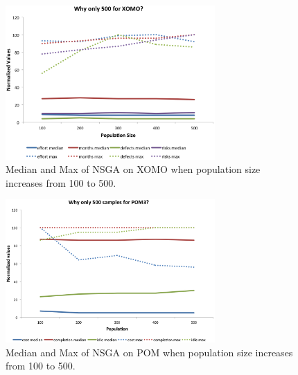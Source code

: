 \documentclass[11pt,twocolumn]{article}
\begin{document}
\begin{figure}
\begin{center}
\includegraphics[width=8cm]{figures/why500xomo.png}
\end{center}
\caption[Why 500 xomo?]{ Median and Max of NSGA on XOMO when population size increases from 100 to 500.}
\label{fig:why500xomo}
\end{figure}

\begin{figure}
\begin{center}
\includegraphics[width=8cm]{figures/why500pom.png}
\end{center}
\caption[Why 500 pom?]{ Median and Max of NSGA on POM when population size increases from 100 to 500.}
\label{fig:why500pom}
\end{figure}
\end{document}
